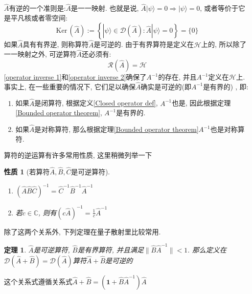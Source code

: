 \documentclass[a4paper,11pt]{book}
\newtheorem{theorem}{\hspace{2em}定理}[section]
\newtheorem{property}{性质}[section]
\begin{document}
$\hat{A}$有逆的一个准则是:$\hat{A}$是一一映射. 也就是说, $\hat{A}|\psi\rangle=0\Longrightarrow|\psi\rangle=0$, 或者等价于它是平凡核或者零空间:
\begin{equation}\label{operator inverse 1}
  \mathrm{Ker}\,(\hat{A}):=\left\{|\psi\rangle\in\mathcal{D}(\hat{A}):\hat{A}|\psi\rangle=0\right\}=\{0\}
\end{equation}
如果$\hat{A}$具有有界逆, 则称算符$\hat{A}$是可逆的. 由于有界算符是定义在$\mathcal{H}$上的, 所以除了一一映射之外, 可逆算符$\hat{A}$还必须有:
\begin{equation}\label{operator inverse 2}
  \mathcal{R}(\hat{A})=\mathcal{H}
\end{equation}
\ref{operator inverse 1}和\ref{operator inverse 2}确保了$A^{-1}$的存在, 并且$A^{-1}$定义在$\mathcal{H}$上. 事实上, 在一些重要的情况下, 它们足以确保$\hat{A}$确实是可逆的(即$A^{-1}$是有界的) , 即:
\begin{enumerate}
  \item 如果$\hat{A}$是闭算符, 根据定义\ref{Closed operator def}, $A^{-1}$也是, 因此根据定理\ref{Bounded operator theorem}, $A^{-1}$是有界的.
  \item 如果$\hat{A}$是对称算符, 那么根据定理\ref{Bounded operator theorem}$A^{-1}$也是对称算符.
\end{enumerate}
算符的逆运算有许多常用性质, 这里稍微列举一下
\begin{property}[若算符$\hat{A},\hat{B},\hat{C}$是可逆算符]\quad
  \begin{enumerate}
    \item $(\hat{A}\hat{B}\hat{C})^{-1}=\hat{C}^{-1}\hat{B}^{-1}\hat{A}^{-1}$
    \item 若$c\in\mathbb{C}$, 则有$(c\hat{A})^{-1}=\frac{1}{c}\hat{A}^{-1}$
  \end{enumerate}
\end{property}
除了这两个关系外, 下列定理在量子散射里比较常用.
\begin{theorem}\label{A+B inverse}
  $\hat{A}$是可逆算符, $\hat{B}$是有界算符, 并且满足$\|\hat{B}\hat{A}^{-1}\|<1$. 那么定义在$\mathcal{D}(\hat{A}+\hat{B})=\mathcal{D}(\hat{A})$算符$\hat{A}+\hat{B}$是可逆的
\end{theorem}
这个关系式遵循关系式$\hat{A}+\hat{B}=(\mathbf{1}+\hat{B}\hat{A}^{-1})\hat{A}$
\end{document}
